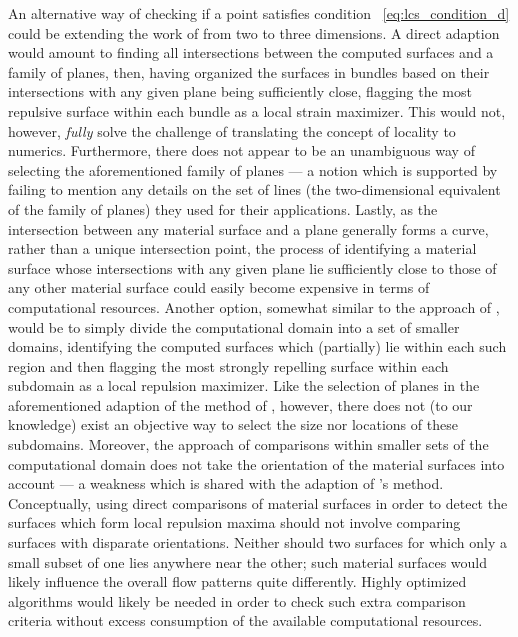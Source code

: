 An alternative way of checking if a point satisfies condition~%
\eqref{eq:lcs_condition_d} could be extending the work of
\textcite{farazmand2012computing} from two to three dimensions. A direct
adaption would amount to finding all intersections between the computed
surfaces and a family of planes, then, having organized the surfaces in bundles
based on their intersections with any given plane being sufficiently close,
flagging the most repulsive surface within each bundle as a local strain
maximizer. This would not, however, \emph{fully} solve the challenge of
translating the concept of locality to numerics. Furthermore, there does not
appear to be an unambiguous way of selecting the aforementioned family of
planes --- a notion which is supported by \textcite{farazmand2012computing}
failing to mention any details on the set of lines (the two-dimensional
equivalent of the family of planes) they used for their applications. Lastly,
as the intersection between any material surface and a plane generally forms a
curve, rather than a unique intersection point, the process of identifying a
material surface whose intersections with any given plane lie sufficiently
close to those of any other material surface could easily become expensive in
terms of computational resources.
\clearpage
Another option, somewhat similar to the approach of
\textcite{farazmand2012computing}, would be to simply divide the computational
domain into a set of smaller domains, identifying the computed surfaces which
(partially) lie within each such region and then flagging the most strongly
repelling surface within each subdomain as a local repulsion maximizer. Like
the selection of planes in the aforementioned adaption of the method of
\citeauthor{farazmand2012computing}, however, there does not (to our knowledge)
exist an objective way to select the size nor locations of these subdomains.
Moreover, the approach of comparisons within smaller sets of the computational
domain does not take the orientation of the material surfaces into account ---
a weakness which is shared with the adaption of
\citeauthor{farazmand2012computing}'s method. Conceptually, using direct
comparisons of material surfaces in order to detect the surfaces which form
local repulsion maxima should not involve comparing surfaces with disparate
orientations. Neither should two surfaces for which only a small subset of one
lies anywhere near the other; such material surfaces would likely influence the
overall flow patterns quite differently. Highly optimized algorithms would
likely be needed in order to check such extra comparison criteria without
excess consumption of the available computational resources.

